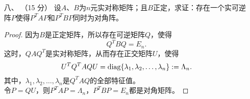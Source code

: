 \begin{enumerate}[1~]
\begin{proof}
因此$\boldsymbol{\boldsymbol{\varepsilon}} _ { 1 } = P ^ { - 1 } \boldsymbol{\alpha} _ { 1 } , \boldsymbol { \boldsymbol{\varepsilon} } _ { 2 } = P ^ { - 1 } \boldsymbol{\alpha} _ { 2 } , \dots , \boldsymbol { \boldsymbol{\varepsilon} } _ { r } = P ^ { - 1 } \boldsymbol{\alpha} _ { r }$。\\
从而
\begin{align*}
P ^ { - 1 } A P &= \left( \lambda _ { 0 } \boldsymbol{\boldsymbol{\varepsilon}} _ { 1 } , \lambda _ { 0 } \boldsymbol{\boldsymbol{\varepsilon}} _ { 2 } , \dots , \lambda _ { 0 } \boldsymbol{\boldsymbol{\varepsilon}} _ { r } , P ^ { - 1 } A \boldsymbol{\boldsymbol{\beta}} _ { 1 } , \dots , P ^ { - 1 } A \boldsymbol { \boldsymbol{\beta} } _ { n-r } \right)\\
&= \left( \begin{array} { c c } { \lambda _ { 0 } I , } & { B } \\ { 0 } & { C } \end{array} \right).
\end{align*}
由于相似的矩阵有相等的特征多项式，因此
\begin{align*}
| \lambda I - A | &= \left| \begin{array} { c c } { \lambda I _ { r } - \lambda _ { 0 } I _ { r } } & { - B } \\ { 0 } & { \lambda I _ { n - r } - C } \end{array} \right|\\
&= \left| \lambda I _ { r } - \lambda _ { 0 } I _ { r } \right| \left| \lambda I _ { n - r } - C \right|\\
&= \left( \lambda - \lambda _ { 0 } \right) ^ { r } \left| \lambda I _ { n - r } - C \right|.
\end{align*}
从而$\lambda_0$的代数重数大于或等于$r$，即$\lambda_0$的代数重数大于或等于$\lambda_0$的几何重数。
\end{proof}

\item[八、]（15 分）
设$A$、$B$为$n$元实对称矩阵；且$B$正定，求证：存在一个实可逆阵$P$使得$P^TAP$和$P^TBP$同时为对角阵。
\begin{proof}
因为$B$是正定矩阵，所以存在可逆矩阵$Q$，使得\[
Q^TBQ=E_n.
\]
这时，$QAQ^T$是实对称矩阵，从而存在正交矩阵$U$，使得\[
U^TQ^TAQU={\rm diag }\{\lambda_1, \lambda_2, \dots, \lambda_n\}:=\Lambda_n.
\]
其中，$\lambda_1, \lambda_2, \dots, \lambda_n$是$Q^TAQ$的全部特征值。\\
令$P=QU$，则$P^TAP=\Lambda_n$，$P^TBP=E_n$都是对角矩阵。
\end{proof}
\end{enumerate}
\endinput